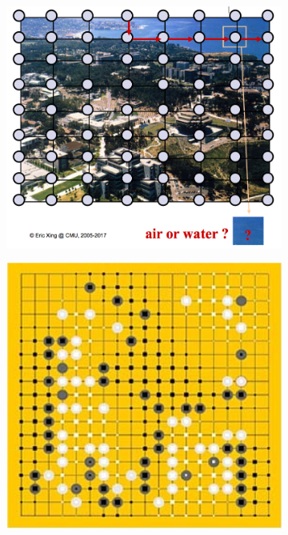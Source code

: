 \documentclass[twoside]{article}
\begin{document}
\begin{figure}[!ht]
\centering
\begin{subfigure}{.3\textwidth}
	\centering
    \includegraphics[width=.9\linewidth]{assets/ugm_ex1.png}
    \caption{}
\end{subfigure}
\begin{subfigure}{.3\textwidth}
	\centering
    \includegraphics[width=.9\linewidth]{assets/ugm_ex2.png}
    \caption{}
\end{subfigure}
\begin{subfigure}{.3\textwidth}

\end{subfigure}
\end{figure}
\end{document}
